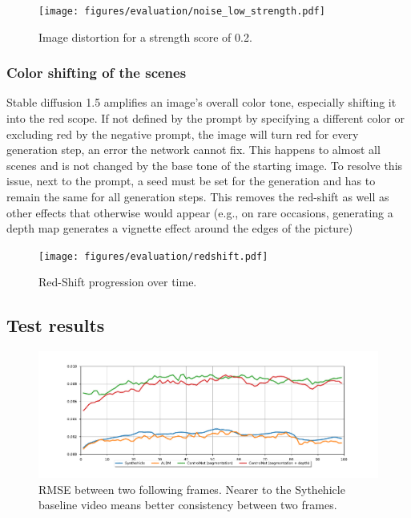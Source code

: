 \begin{figure}[H]
  \centering
  \texttt{[image: figures/evaluation/noise\_low\_strength.pdf]}
  \caption{Image distortion for a strength score of 0.2.}
  \label{fig:strength}
  \clearpage
\end{figure}

\subsubsection{Color shifting of the scenes}
\label{sec:color_shifting_of_the_scenes}

Stable diffusion 1.5 amplifies an image's overall color tone, especially shifting it into the red scope. If not defined by the prompt by specifying a different color or excluding red by the negative prompt, the image will turn red for every generation step, an error the network cannot fix. This happens to almost all scenes and is not changed by the base tone of the starting image. To resolve this issue, next to the prompt, a seed must be set for the generation and has to remain the same for all generation steps. This removes the red-shift as well as other effects that otherwise would appear (e.g., on rare occasions, generating a depth map generates a vignette effect around the edges of the picture)

\begin{figure}[H]
  \centering
  \texttt{[image: figures/evaluation/redshift.pdf]}
  \caption{Red-Shift progression over time.}
  \label{fig:redshift}
  \clearpage
\end{figure}

\subsection{Test results}

\begin{figure}[H]
  \centering
  \includegraphics[width=\textwidth]{figures/evaluation/plot_rmse.pdf}
  \caption{RMSE between two following frames. Nearer to the Sythehicle baseline video means better consistency between two frames.}
  \label{fig:rmse_video}
  \clearpage
\end{figure}

